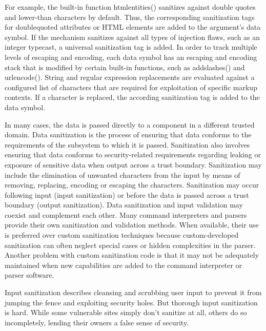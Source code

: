 For example, the built-in function htmlentities() sanitizes
against double quotes and lower-than characters by default.
Thus, the corresponding sanitization tags for doublequoted
attributes or HTML elements are added to the argument's
data symbol. If the mechanism sanitizes against all
types of injection flaws, such as an integer typecast, a universal
sanitization tag is added. In order to track multiple levels
of escaping and encoding, each data symbol has an escaping
and encoding stack that is modified by certain built-in
functions, such as addslashes() and urlencode(). String
and regular expression replacements are evaluated against a
configured list of characters that are required for exploitation
of specific markup contexts. If a character is replaced,
the according sanitization tag is added to the data symbol.


In many cases, the data is passed directly to a component in a different trusted domain. Data sanitization is the process of ensuring that data conforms to the requirements of the subsystem to which it is passed. Sanitization also involves ensuring that data conforms to security-related requirements regarding leaking or exposure of sensitive data when output across a trust boundary. Sanitization may include the elimination of unwanted characters from the input by means of removing, replacing, encoding or escaping the characters. Sanitization may occur following input (input sanitization) or before the data is passed across a trust boundary (output sanitization). Data sanitization and input validation may coexist and complement each other. Many command interpreters and parsers provide their own sanitization and validation methods. When available, their use is preferred over custom sanitization techniques because custom-developed sanitization can often neglect special cases or hidden complexities in the parser. Another problem with custom sanitization code is that it may not be adequately maintained when new capabilities are added to the command interpreter or parser software.

Input sanitization describes cleansing and scrubbing user input to prevent it from jumping the fence and exploiting security holes. But thorough input sanitization is hard. While some vulnerable sites simply don't sanitize at all, others do so incompletely, lending their owners a false sense of security.

